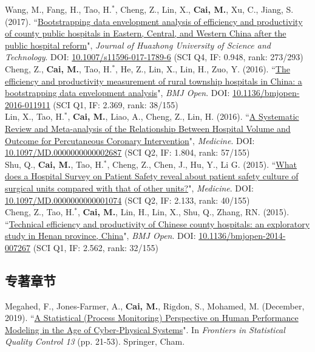 \documentclass[11pt, a4paper]{article}
\newcommand{\years}[1]{\marginnote{\scriptsize #1}}
\begin{document}
\years{2017}Wang, M., Fang, H., Tao, H.$^\ast$, Cheng, Z., Lin, X., \textbf{Cai, M.}, Xu, C., Jiang, S. (2017). ``\ul{Bootstrapping data envelopment analysis of efficiency and productivity of county public hospitals in Eastern, Central, and Western China after the public hospital reform}", \emph{Journal of Huazhong University of Science and Technology}. DOI: \href{https://doi.org/10.1007/s11596-017-1789-6}{10.1007/s11596-017-1789-6} (SCI Q4, IF: 0.948, rank: 273/293)\\[6pt]
\years{2016}Cheng, Z., \textbf{Cai, M.}, Tao, H.$^\ast$, He, Z., Lin, X., Lin, H., Zuo, Y. (2016). ``\ul{The efficiency and productivity measurement of rural township hospitals in China: a bootstrapping data envelopment analysis}", \emph{BMJ Open}. DOI: \href{https://doi.org/10.1136/bmjopen-2016-011911}{10.1136/bmjopen-2016-011911} (SCI Q1, IF: 2.369, rank: 38/155)\\[6pt]
\years{2016}Lin, X., Tao, H.$^\ast$, \textbf{Cai, M.}, Liao, A., Cheng, Z., Lin, H. (2016). ``\ul{A Systematic Review and Meta-analysis of the Relationship Between Hospital Volume and Outcome for Percutaneous Coronary Intervention}", \emph{Medicine}. DOI: \href{https://doi.org/10.1097/MD.0000000000002687}{10.1097/MD.0000000000002687} (SCI Q2, IF: 1.804, rank: 57/155)\\[6pt]
\years{2015}Shu, Q., \textbf{Cai, M.}, Tao, H.$^\ast$, Cheng, Z., Chen, J., Hu, Y., Li G. (2015). ``\ul{What does a Hospital Survey on Patient Safety reveal about patient safety culture of surgical units compared with that of other units?}", \emph{Medicine}. DOI: \href{https://doi.org/10.1097/MD.0000000000001074}{10.1097/MD.0000000000001074} (SCI Q2, IF: 2.133, rank: 40/155)\\[6pt]
\years{2015}Cheng, Z., Tao, H.$^\ast$, \textbf{Cai, M.}, Lin, H., Lin, X., Shu, Q., Zhang, RN. (2015). ``\ul{Technical efficiency and productivity of Chinese county hospitals: an exploratory study in Henan province, China}", \emph{BMJ Open}. DOI: \href{https://doi.org/10.1136/bmjopen-2014-007267}{10.1136/bmjopen-2014-007267} (SCI Q1, IF: 2.562, rank: 32/155)

\subsection*{专著章节}
\years{2019}Megahed, F., Jones-Farmer, A., \textbf{Cai, M.}, Rigdon, S., Mohamed, M. (December, 2019). ``\ul{A Statistical (Process Monitoring) Perspective on Human Performance Modeling in the Age of Cyber-Physical Systems}". In \textit{Frontiers in Statistical Quality Control 13} (pp. 21-53). Springer, Cham.
\end{document}
